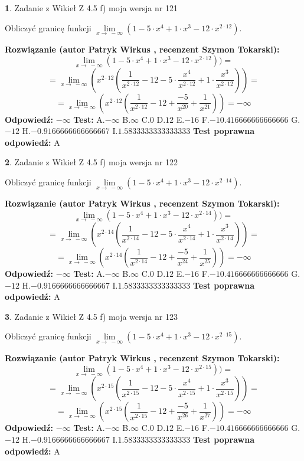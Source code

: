 \documentclass[12pt, a4paper]{article}
\theoremstyle{definition} %
\newtheorem{zad}{}
\newcommand{\zadStart}[1]{\begin{zad}#1\newline}
\newcommand{\zadStop}{\end{zad}}
\newcommand{\rozwStart}[2]{\noindent \textbf{Rozwiązanie (autor #1 , recenzent #2): }\newline}
\newcommand{\rozwStop}{\newline}
\newcommand{\odpStart}{\noindent \textbf{Odpowiedź:}\newline}
\newcommand{\odpStop}{\newline}
\newcommand{\testStart}{\noindent \textbf{Test:}\newline}
\newcommand{\testStop}{\newline}
\newcommand{\kluczStart}{\noindent \textbf{Test poprawna odpowiedź:}\newline}
\newcommand{\kluczStop}{\newline}
\begin{document}
\zadStart{Zadanie z Wikieł Z 4.5 f) moja wersja nr 121}


Obliczyć granicę funkcji  $\lim\limits_{x\to\ -\infty}(1 - 5 \cdot x^{4}+1 \cdot x^{3}- 12 \cdot x^{2\cdot12})$.
\zadStop
\rozwStart{Patryk Wirkus}{Szymon Tokarski}
$$\lim\limits_{x\to\ -\infty}(1 - 5 \cdot x^{4}+1 \cdot x^{3}- 12 \cdot x^{2\cdot12}))=$$
$$=\lim\limits_{x\to\ -\infty}(x^{2\cdot12}(\frac{1}{x^{2\cdot12}}-12 -5 \cdot \frac{x^{4}}{x^{2\cdot12}}+1 \cdot \frac{x^{3}}{x^{2\cdot12}}))=$$
$$=\lim\limits_{x\to\ -\infty}(x^{2\cdot12}(\frac{1}{x^{2\cdot12}}-12 + \frac{-5}{x^{20}}+ \frac{1}{x^{21}}))=-\infty$$
\rozwStop
\odpStart
$-\infty$
\odpStop
\testStart
A.$-\infty$ B.$\infty$ C.$0$ D.$12$ E.$-16$
F.$-10.416666666666666$ G.$-12$
H.$-0.9166666666666667$
I.$1.5833333333333333$
\testStop
\kluczStart
A
\kluczStop



\zadStart{Zadanie z Wikieł Z 4.5 f) moja wersja nr 122}


Obliczyć granicę funkcji  $\lim\limits_{x\to\ -\infty}(1 - 5 \cdot x^{4}+1 \cdot x^{3}- 12 \cdot x^{2\cdot14})$.
\zadStop
\rozwStart{Patryk Wirkus}{Szymon Tokarski}
$$\lim\limits_{x\to\ -\infty}(1 - 5 \cdot x^{4}+1 \cdot x^{3}- 12 \cdot x^{2\cdot14}))=$$
$$=\lim\limits_{x\to\ -\infty}(x^{2\cdot14}(\frac{1}{x^{2\cdot14}}-12 -5 \cdot \frac{x^{4}}{x^{2\cdot14}}+1 \cdot \frac{x^{3}}{x^{2\cdot14}}))=$$
$$=\lim\limits_{x\to\ -\infty}(x^{2\cdot14}(\frac{1}{x^{2\cdot14}}-12 + \frac{-5}{x^{24}}+ \frac{1}{x^{25}}))=-\infty$$
\rozwStop
\odpStart
$-\infty$
\odpStop
\testStart
A.$-\infty$ B.$\infty$ C.$0$ D.$12$ E.$-16$
F.$-10.416666666666666$ G.$-12$
H.$-0.9166666666666667$
I.$1.5833333333333333$
\testStop
\kluczStart
A
\kluczStop



\zadStart{Zadanie z Wikieł Z 4.5 f) moja wersja nr 123}


Obliczyć granicę funkcji  $\lim\limits_{x\to\ -\infty}(1 - 5 \cdot x^{4}+1 \cdot x^{3}- 12 \cdot x^{2\cdot15})$.
\zadStop
\rozwStart{Patryk Wirkus}{Szymon Tokarski}
$$\lim\limits_{x\to\ -\infty}(1 - 5 \cdot x^{4}+1 \cdot x^{3}- 12 \cdot x^{2\cdot15}))=$$
$$=\lim\limits_{x\to\ -\infty}(x^{2\cdot15}(\frac{1}{x^{2\cdot15}}-12 -5 \cdot \frac{x^{4}}{x^{2\cdot15}}+1 \cdot \frac{x^{3}}{x^{2\cdot15}}))=$$
$$=\lim\limits_{x\to\ -\infty}(x^{2\cdot15}(\frac{1}{x^{2\cdot15}}-12 + \frac{-5}{x^{26}}+ \frac{1}{x^{27}}))=-\infty$$
\rozwStop
\odpStart
$-\infty$
\odpStop
\testStart
A.$-\infty$ B.$\infty$ C.$0$ D.$12$ E.$-16$
F.$-10.416666666666666$ G.$-12$
H.$-0.9166666666666667$
I.$1.5833333333333333$
\testStop
\kluczStart
A
\kluczStop
\end{document}
